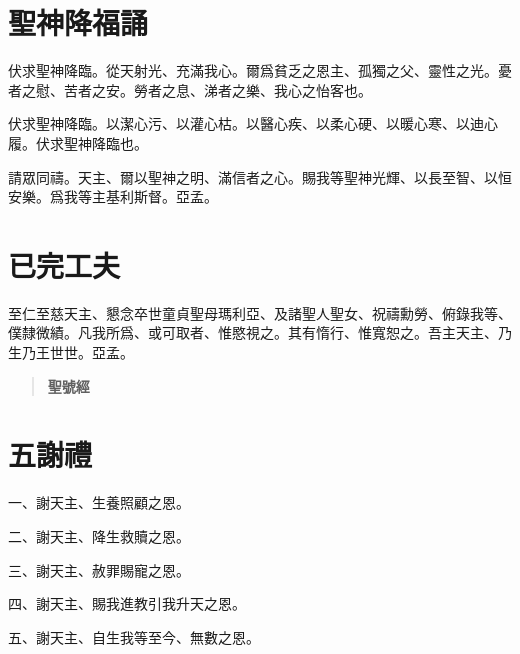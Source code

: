 \section*{聖神降福誦}
伏求聖神降臨。從天射光、充滿我心。爾爲貧乏之恩主、孤獨之父、靈性之光。憂者之慰、苦者之安。勞者之息、涕者之樂、我心之怡客也。

伏求聖神降臨。以潔心污、以灌心枯。以醫心疾、以柔心硬、以暖心寒、以迪心履。伏求聖神降臨也。

請眾同禱。{\cspace}天主、爾以聖神之明、滿信者之心。賜我等聖神光輝、以長至智、以恒安樂。爲我等主基利斯督。{\cspace}亞孟。

\section*{已完工夫}
至仁至慈天主、懇念卒世童貞聖母瑪利亞、及諸聖人聖女、祝禱勳勞、俯錄我等、僕隸微績。凡我所爲、或可取者、惟愍視之。其有惰行、惟寬恕之。吾主天主、乃生乃王世世。{\cspace}亞孟。

\begin{quote}
{\bfseries 聖號經}
\end{quote}

\section*{五謝禮}
\noindent 一、謝天主、生養照顧之恩。

\noindent 二、謝天主、降生救贖之恩。

\noindent 三、謝天主、赦罪賜寵之恩。

\noindent 四、謝天主、賜我進教引我升天之恩。

\noindent 五、謝天主、自生我等至今、無數之恩。
